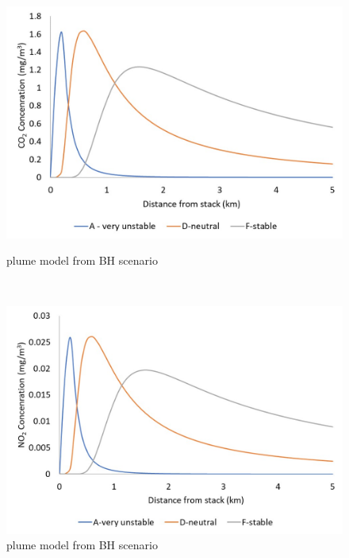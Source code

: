 \begin{figure}[t]
    \centering
    \begin{minipage}[t]{0.5\textwidth}
        \centering
        \includegraphics[width=\linewidth]{chapters/5-safety-layout-environment/figures/CO2plumeBH.jpg}
        \caption{ plume model from BH scenario}
        \label{fig:CO2plumeBH}
    \end{minipage}%
    ~ 
    \begin{minipage}[t]{0.5\textwidth}
        \centering
        \includegraphics[width=\linewidth]{chapters/5-safety-layout-environment/figures/NO2plumeBH.jpg}
        \caption{ plume model from BH scenario}
         \label{fig:NO2plumeBH}
    \end{minipage}
    
\end{figure}


